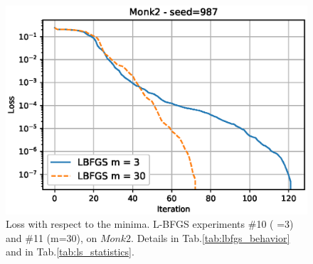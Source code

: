 \documentclass[11pt]{article}
\begin{document}
\begin{figure}[H]
\footnotesize
    \centering
    \includegraphics[scale = 0.6]{Images/m2-987_lbfgs.eps}
    \caption{Loss with respect to the minima. L-BFGS experiments \#10 ( =3) and \#11 (m=30), on $Monk2$. Details in Tab.\ref{tab:lbfgs_behavior} and in Tab.\ref{tab:ls_statistics}.}
    \label{fig:monk3_lbfgs}
\end{figure}
\end{document}
